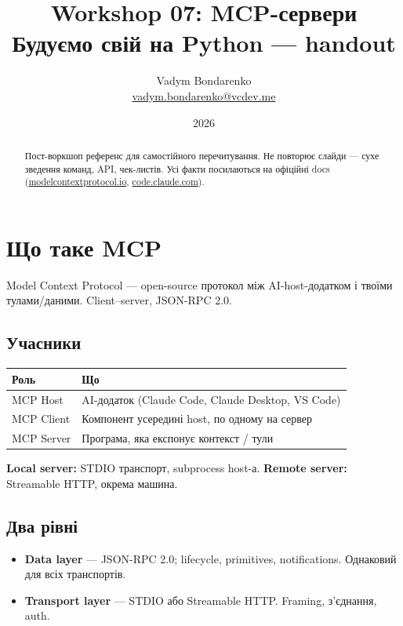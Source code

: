 \documentclass[11pt,a4paper]{article}
\title{%
  {\Huge\bfseries Workshop 07: MCP-сервери}\\[0.6em]
  {\large Будуємо свій на Python --- handout}
}
\author{Vadym Bondarenko \\ \small\href{mailto:vadym.bondarenko@vcdev.me}{vadym.bondarenko@vcdev.me}}
\date{2026}
\begin{document}
\maketitle

\begin{abstract}
Пост-воркшоп референс для самостійного перечитування. Не повторює слайди --- сухе зведення команд, API, чек-листів. Усі факти посилаються на офіційні docs (\href{https://modelcontextprotocol.io}{modelcontextprotocol.io}, \href{https://code.claude.com/docs/en/mcp}{code.claude.com}).
\end{abstract}

\tableofcontents
\newpage

\section{Що таке MCP}

Model Context Protocol --- open-source протокол між AI-host-додатком і твоїми тулами/даними. Client--server, JSON-RPC 2.0.

\subsection{Учасники}

\begin{tabular}{ll}
\hline
\textbf{Роль} & \textbf{Що} \\
\hline
MCP Host & AI-додаток (Claude Code, Claude Desktop, VS Code) \\
MCP Client & Компонент усередині host, по одному на сервер \\
MCP Server & Програма, яка експонує контекст / тули \\
\hline
\end{tabular}

\textbf{Local server:} STDIO транспорт, subprocess host-а. \textbf{Remote server:} Streamable HTTP, окрема машина.

\subsection{Два рівні}

\begin{itemize}
\item \textbf{Data layer} --- JSON-RPC 2.0; lifecycle, primitives, notifications. Однаковий для всіх транспортів.
\item \textbf{Transport layer} --- STDIO або Streamable HTTP. Framing, з'єднання, auth.
\end{itemize}
\end{document}
